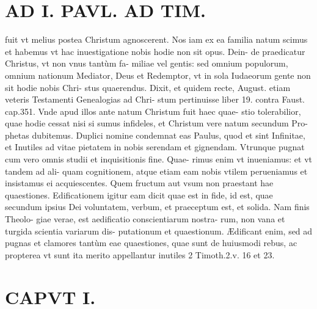\documentclass{article}
\begin{document}
\begin{pages}
\section*{AD I. PAVL. AD TIM. }
\marginpar{[ p.12 ]}\pstart fuit vt melius postea Christum agnoscerent. Nos iam ex ea familia natum scimus et habemus vt hac inuestigatione nobis hodie non sit opus. Dein- de praedicatur Christus, vt non vnus tantùm fa- miliae vel gentis: sed omnium populorum, omnium nationum Mediator, Deus et Redemptor, vt in sola Iudaeorum gente non sit hodie nobis Chri- stus quaerendus. Dixit, et quidem recte, August. etiam veteris Testamenti Genealogias ad Chri- stum pertinuisse liber 19. contra Faust. cap.351. Vnde apud illos ante natum Christum fuit haec quae- stio tolerabilior, quae hodie cessat nisi si sumus infideles, et Christum vere natum secundum Pro- phetas dubitemus.  \pend\pstart Duplici nomine condemnat eas Paulus, quod et sint Infinitae, et Inutiles ad vitae pietatem in nobis serendam et gignendam. Vtrunque pugnat cum vero omnis studii et inquisitionis fine. Quae- rimus enim vt inueniamus: et vt tandem ad ali- quam cognitionem, atque etiam eam nobis vtilem perueniamus et insistamus ei acquiescentes. Quem fructum aut vsum non praestant hae quaestiones. Edificationem igitur eam dicit quae est in fide, id est, quae secundum ipsius Dei voluntatem, verbum, et praeceptum est, et solida. Nam finis Theolo- giae verae, est aedificatio conscientiarum nostra- rum, non vana et turgida scientia variarum dis- putationum et quaestionum. Ædificant enim, sed ad pugnas et clamores tantùm eae quaestiones, quae sunt de huiusmodi rebus, ac propterea vt sunt ita merito appellantur inutiles 2 Timoth.2.v. 16 et 23.  \pend
\section*{CAPVT I. }
\marginpar{[ p.13 ]}
{}

\end{pages}
\end{document}

